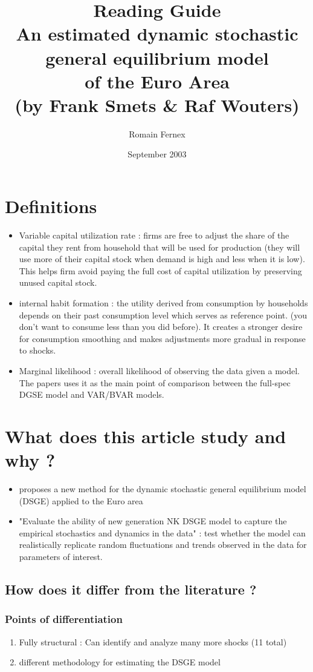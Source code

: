 \documentclass{article}
\title{Reading Guide\\[1ex] \large An estimated dynamic stochastic general equilibrium model\\[0.5ex] \normalsize of the Euro Area \\  
\small (by Frank Smets \& Raf Wouters)}
\author{Romain Fernex}
\date{September 2003}
\begin{document}
\maketitle
\tableofcontents
\newpage


\section{Definitions}
\begin{itemize}
    \item Variable capital utilization rate : firms are free to adjust the share of the capital they rent from household that will be used for production (they will use more of their capital stock when demand is high and less when it is low). This helps firm avoid paying the full cost of capital utilization by preserving unused capital stock. 
    \item internal habit formation : the utility derived from consumption by households depends on their past consumption level which serves as reference point. (you don't want to consume less than you did before). It creates a stronger desire for consumption smoothing and makes adjustments more gradual in response to shocks. 
    \item Marginal likelihood : overall likelihood of observing the data given a model. The papers uses it as the main point of comparison between the full-spec DGSE model and VAR/BVAR models. 
\end{itemize}

\section{What does this article study and why ?}
\begin{itemize}
    \item proposes a new method for the dynamic stochastic general equilibrium model (DSGE) applied to the Euro area 
    \item "Evaluate the ability of new generation NK DSGE model to capture the empirical stochastics and dynamics in the data" : test whether the model can realistically replicate random fluctuations and trends observed in the data for parameters of interest. 
\end{itemize}

\subsection{How does it differ from the literature ?}
\subsubsection{Points of differentiation}
\begin{enumerate}
    \item Fully structural : Can identify and analyze many more shocks (11 total)
    \item different methodology for estimating the DSGE model
\end{enumerate}
\end{document}
